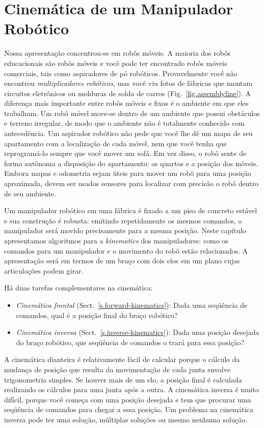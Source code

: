 
\chapter{Cinemática de um Manipulador Robótico}\label{ch.kinematics}

Nossa apresentação concentrou-se em robôs móveis. A maioria dos robôs educacionais são robôs móveis e você pode ter encontrado robôs móveis comerciais, tais como aspiradores de pó robóticos. Provavelmente você não encontrou \emph{multiplicadores robóticos}, mas você viu fotos de fábricas que montam circuitos eletrônicos ou molduras de solda de carros (Fig.~\ref{fig.assemblyline}). A diferença mais importante entre robôs móveis e fixos é o ambiente em que eles trabalham. Um robô móvel move-se dentro de um ambiente que possui obstáculos e terreno irregular, de modo que o ambiente não é totalmente conhecido com antecedência. Um aspirador robótico não pede que você lhe dê um mapa de seu apartamento com a localização de cada móvel, nem que você tenha que reprogramá-lo sempre que você mover um sofá. Em vez disso, o robô sente de forma autônoma a disposição do apartamento: os quartos e a posição dos móveis. Embora mapas e odometria sejam úteis para mover um robô para uma posição aproximada, devem ser usados sensores para localizar com precisão o robô dentro de seu ambiente.

Um manipulador robótico em uma fábrica é fixado a um piso de concreto estável e sua construção é robusta: emitindo repetidamente os mesmos comandos, o manipulador será movido precisamente para a mesma posição. Neste capítulo apresentamos algoritmos para a \emph{kinematics} dos manipuladores: como os comandos para um manipulador e o movimento do robô estão relacionados. A apresentação será em termos de um braço com dois elos em um plano cujas articulações podem girar.

Há duas tarefas complementares na cinemática:
\begin{itemize}
\item \textit{Cinemática frontal} (Sect.~\ref{s.forward-kinematics}): Dada uma seqüência de comandos, qual é a posição final do braço robótico?
\item \textit{Cinemática inversa} (Sect.~\ref{s.inverse-kinematics}): Dada uma posição desejada do braço robótico, que seqüência de comandos o trará para essa posição?
\end{itemize}

A cinemática dianteira é relativamente fácil de calcular porque o cálculo da mudança de posição que resulta da movimentação de cada junta envolve trigonometria simples. Se houver mais de um elo, a posição final é calculada realizando os cálculos para uma junta após a outra. A cinemática inversa é muito difícil, porque você começa com uma posição desejada e tem que procurar uma seqüência de comandos para chegar a essa posição. Um problema na cinemática inversa pode ter uma solução, múltiplas soluções ou mesmo nenhuma solução.


